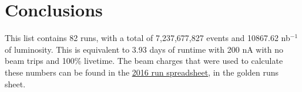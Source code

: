 \documentclass[11pt]{article}
\begin{document}
\section{Conclusions}
This list contains 82 runs, with a total of 7,237,677,827 events and 10867.62 nb$^{-1}$ of luminosity.  This is equivalent to 3.93 days of runtime with 200 nA with no beam trips and 100\% livetime.  The beam charges that were used to calculate these numbers can be found in the \href{https://docs.google.com/spreadsheets/d/1X_TfOQyQBv9Ja1IQ5LYImk0sd00eN-d4zzkCwn-CSUM/edit#gid=43855609}{\underline{2016 run spreadsheet}}, in the golden runs sheet.
\end{document}
